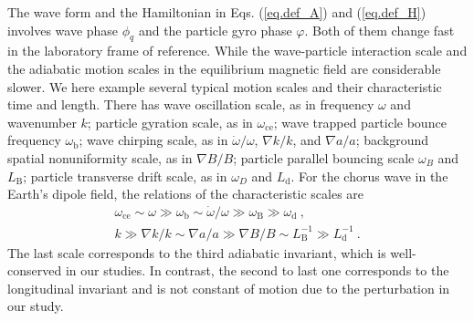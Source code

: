 The wave form and the Hamiltonian in Eqs. (\ref{eq.def_A}) and (\ref{eq.def_H}) involves wave phase $\phi_q$ and the particle gyro phase $\varphi$. Both of them change fast in the laboratory frame of reference. While the wave-particle interaction scale and the adiabatic motion scales in the equilibrium magnetic field are considerable slower. 
We here example several typical motion scales and their characteristic time and length. There has wave oscillation scale, as in frequency $\omega$ and wavenumber $k$; particle gyration scale, as in $\omega_\mathrm{ce}$; wave trapped particle bounce frequency $\omega_\mathrm{b}$; wave chirping scale, as in $\dot{\omega}/\omega$, $\nabla k/k$, and $\nabla a/a$; background spatial nonuniformity scale, as in $\nabla B/B$; particle parallel bouncing scale $\omega_B$ and $L_\mathrm{B}$; particle transverse drift scale, as in $\omega_D$ and $L_\mathrm{d}$. 
For the chorus wave in the Earth's dipole field, the relations of the characteristic scales are
\begin{equation}
    \begin{aligned}
        \omega_\mathrm{ce} \sim \omega \gg \omega_\mathrm{b} \sim \dot\omega/\omega  \gg \omega_\mathrm{B} \gg \omega_\mathrm{d}~,\\
        k \gg \nabla k/k\sim \nabla a/a \gg \nabla B/B \sim L_\mathrm{B}^{-1} \gg L_\mathrm{d}^{-1}~.
    \end{aligned}
\end{equation}
The last scale corresponds to the third adiabatic invariant, which is well-conserved in our studies. 
In contrast, the second to last one corresponds to the longitudinal invariant and is not constant of motion due to the perturbation in our study.  

